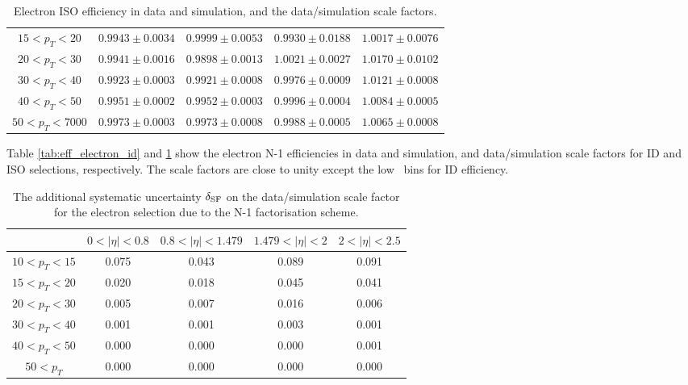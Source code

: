 \begin{table}[!htp]
\begin{center}
\begin{tabular}{c|c|c|c|c}
$ 15 < p_T <  20$ & $0.9943 \pm 0.0034$ & $0.9999 \pm 0.0053$ & $0.9930 \pm 0.0188$ & $1.0017 \pm 0.0076$  \\
$ 20 < p_T <  30$ & $0.9941 \pm 0.0016$ & $0.9898 \pm 0.0013$ & $1.0021 \pm 0.0027$ & $1.0170 \pm 0.0102$  \\
$ 30 < p_T <  40$ & $0.9923 \pm 0.0003$ & $0.9921 \pm 0.0008$ & $0.9976 \pm 0.0009$ & $1.0121 \pm 0.0008$  \\
$ 40 < p_T <  50$ & $0.9951 \pm 0.0002$ & $0.9952 \pm 0.0003$ & $0.9996 \pm 0.0004$ & $1.0084 \pm 0.0005$  \\
$ 50 < p_T < 7000$ & $0.9973 \pm 0.0003$ & $0.9973 \pm 0.0008$ & $0.9988 \pm 0.0005$ & $1.0065 \pm 0.0008$  \\
\hline
\end{tabular}
\caption{Electron ISO efficiency in data and simulation, and the data/simulation scale factors.}
\label{tab:eff_electron_iso}
\end{center}
\end{table}


Table \ref{tab:eff_electron_id} and \ref{tab:eff_electron_iso} show 
the electron N-1 efficiencies in data and simulation, and data/simulation scale factors 
for ID and ISO selections, respectively. 
The scale factors are close to unity except the low \pt~bins for ID efficiency. 

%
\begin{table}[!htp]
\begin{center}
\begin{tabular}{c|c|c|c|c}
\hline & $0 < |\eta| < 0.8$ & $0.8 < |\eta| < 1.479$ & $1.479 < |\eta| < 2$ & $2 < |\eta| < 2.5$  \\
\hline
$ 10 < p_T <  15$ &    0.075  &     0.043  &     0.089  &     0.091  \\
$ 15 < p_T <  20$ &    0.020  &     0.018  &     0.045  &     0.041  \\
$ 20 < p_T <  30$ &    0.005  &     0.007  &     0.016  &     0.006  \\
$ 30 < p_T <  40$ &    0.001  &     0.001  &     0.003  &     0.001  \\
$ 40 < p_T <  50$ &    0.000  &     0.000  &     0.000  &     0.001  \\
$ 50 < p_T $ &   0.000  &     0.000  &     0.000  &     0.000  \\
\hline
\end{tabular}
\caption{The additional systematic uncertainty $\delta_{\rm{SF}}$ on the data/simulation scale factor 
for the electron selection due to the N-1 factorisation scheme.}
\label{tab:eff_electron_nmsyst}
\end{center}
\end{table}

